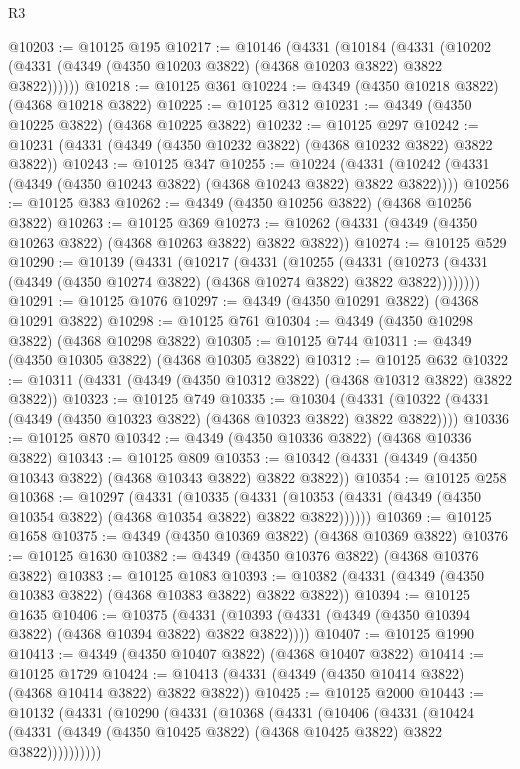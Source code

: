 \begin{lexlean}{R3}
\begin{coremodule}
@10203 := @10125 @195
@10217 := @10146
    (@4331
      (@10184
        (@4331 (@10202 (@4331 (@4349 (@4350 @10203 @3822) (@4368 @10203 @3822) @3822 @3822))))))
@10218 := @10125 @361
@10224 := @4349 (@4350 @10218 @3822) (@4368 @10218 @3822)
@10225 := @10125 @312
@10231 := @4349 (@4350 @10225 @3822) (@4368 @10225 @3822)
@10232 := @10125 @297
@10242 := @10231 (@4331 (@4349 (@4350 @10232 @3822) (@4368 @10232 @3822) @3822 @3822))
@10243 := @10125 @347
@10255 := @10224
    (@4331 (@10242 (@4331 (@4349 (@4350 @10243 @3822) (@4368 @10243 @3822) @3822 @3822))))
@10256 := @10125 @383
@10262 := @4349 (@4350 @10256 @3822) (@4368 @10256 @3822)
@10263 := @10125 @369
@10273 := @10262 (@4331 (@4349 (@4350 @10263 @3822) (@4368 @10263 @3822) @3822 @3822))
@10274 := @10125 @529
@10290 := @10139
    (@4331
      (@10217
        (@4331
          (@10255
            (@4331
              (@10273 (@4331 (@4349 (@4350 @10274 @3822) (@4368 @10274 @3822) @3822 @3822))))))))
@10291 := @10125 @1076
@10297 := @4349 (@4350 @10291 @3822) (@4368 @10291 @3822)
@10298 := @10125 @761
@10304 := @4349 (@4350 @10298 @3822) (@4368 @10298 @3822)
@10305 := @10125 @744
@10311 := @4349 (@4350 @10305 @3822) (@4368 @10305 @3822)
@10312 := @10125 @632
@10322 := @10311 (@4331 (@4349 (@4350 @10312 @3822) (@4368 @10312 @3822) @3822 @3822))
@10323 := @10125 @749
@10335 := @10304
    (@4331 (@10322 (@4331 (@4349 (@4350 @10323 @3822) (@4368 @10323 @3822) @3822 @3822))))
@10336 := @10125 @870
@10342 := @4349 (@4350 @10336 @3822) (@4368 @10336 @3822)
@10343 := @10125 @809
@10353 := @10342 (@4331 (@4349 (@4350 @10343 @3822) (@4368 @10343 @3822) @3822 @3822))
@10354 := @10125 @258
@10368 := @10297
    (@4331
      (@10335
        (@4331 (@10353 (@4331 (@4349 (@4350 @10354 @3822) (@4368 @10354 @3822) @3822 @3822))))))
@10369 := @10125 @1658
@10375 := @4349 (@4350 @10369 @3822) (@4368 @10369 @3822)
@10376 := @10125 @1630
@10382 := @4349 (@4350 @10376 @3822) (@4368 @10376 @3822)
@10383 := @10125 @1083
@10393 := @10382 (@4331 (@4349 (@4350 @10383 @3822) (@4368 @10383 @3822) @3822 @3822))
@10394 := @10125 @1635
@10406 := @10375
    (@4331 (@10393 (@4331 (@4349 (@4350 @10394 @3822) (@4368 @10394 @3822) @3822 @3822))))
@10407 := @10125 @1990
@10413 := @4349 (@4350 @10407 @3822) (@4368 @10407 @3822)
@10414 := @10125 @1729
@10424 := @10413 (@4331 (@4349 (@4350 @10414 @3822) (@4368 @10414 @3822) @3822 @3822))
@10425 := @10125 @2000
@10443 := @10132
    (@4331
      (@10290
        (@4331
          (@10368
            (@4331
              (@10406
                (@4331
                  (@10424
                    (@4331 (@4349 (@4350 @10425 @3822) (@4368 @10425 @3822) @3822 @3822))))))))))

\end{coremodule}
\end{lexlean}
